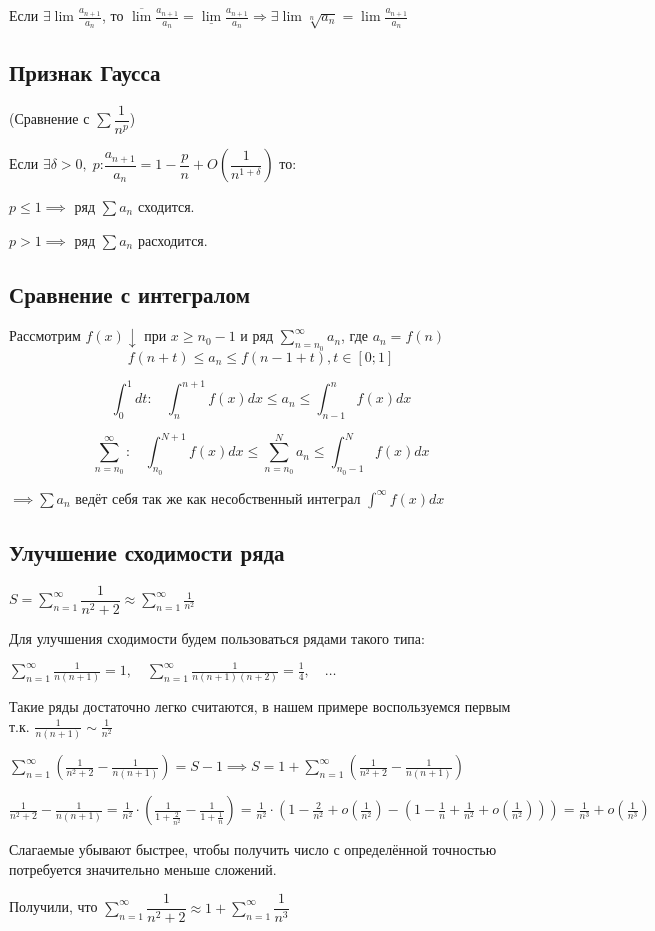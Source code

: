 Если $\exists \lim \frac{a_{n+1}}{a_n}$, то $\overline{\lim} \frac{a_{n+1}}{a_n} = \underline{\lim} \frac{a_{n+1}}{a_n} \Rightarrow \exists \lim \sqrt[n]{a_n} = \lim \frac{a_{n+1}}{a_n}$

\subsection{Признак Гаусса}
(Сравнение с $\sum \dfrac{1}{n^p}$)

Если $\exists \delta > 0,\; p$:$ \dfrac{a_{n+1}}{a_n} = 1 - \dfrac{p}{n} + O\left(\dfrac{1}{n^{1 + \delta}}\right) $
то:

$p \leq 1 \implies$ ряд $\sum a_n$ сходится.

$p > 1 \implies$ ряд $\sum a_n$ расходится.

\subsection{Сравнение с интегралом}

Рассмотрим $f(x) \downarrow$ при $x \geq n_0 - 1$ и ряд $\sum_{n=n_0}^{\infty} a_n$, где $a_n = f(n)$ 
$$f(n + t) \leq a_n \leq f(n - 1 + t), t \in [0; 1]$$

$$\int_{0}^{1} dt : \ \ \ \ \int_{n}^{n+1} f(x)dx \leq a_n \leq \int_{n-1}^{n} f(x)dx$$

$$\sum_{n=n_0}^{\infty} : \ \ \ \ \int_{n_0}^{N+1} f(x)dx \leq \sum_{n=n_0}^{N} a_n \leq \int_{n_0-1}^{N} f(x)dx$$

$\implies \sum a_n$ ведёт себя так же как несобственный интеграл $\int^{\infty}f(x)dx$

\subsection{Улучшение сходимости ряда}

\example $S = \sum_{n=1}^{\infty} \dfrac{1}{n^2 + 2} \approx \sum_{n=1}^{\infty} \frac{1}{n^2}$

Для улучшения сходимости будем пользоваться рядами такого типа:

$\sum_{n=1}^{\infty} \frac{1}{n(n+1)} = 1,\quad \sum_{n=1}^{\infty} \frac{1}{n(n+1)(n+2)} = \frac{1}{4},\quad \dots$

Такие ряды достаточно легко считаются, в нашем примере воспользуемся первым т.к. $\frac{1}{n(n+1)} \sim \frac{1}{n^2}$

$\sum_{n=1}^{\infty} \left(\frac{1}{n^2+2} - \frac{1}{n(n+1)}\right) = S - 1 \implies S = 1 + \sum_{n=1}^{\infty} \left(\frac{1}{n^2 + 2} - \frac{1}{n(n+1)}\right)$

$\frac{1}{n^2+2} - \frac{1}{n(n+1)} = \frac{1}{n^2} \cdot \left(\frac{1}{1 + \frac{2}{n^2}} - \frac{1}{1 + \frac{1}{n}}\right) = \frac{1}{n^2} \cdot \left(1 - \frac{2}{n^2} + o\left(\frac{1}{n^2}\right) - \left(1 - \frac{1}{n} + \frac{1}{n^2} + o\left(\frac{1}{n^2}\right)\right)\right) = \frac{1}{n^3} + o\left(\frac{1}{n^3}\right)$

Слагаемые убывают быстрее, чтобы получить число с определённой точностью потребуется значительно меньше сложений.

Получили, что $\sum_{n=1}^{\infty} \dfrac{1}{n^2 + 2} \approx 1 + \sum_{n=1}^{\infty} \dfrac{1}{n^3}$


